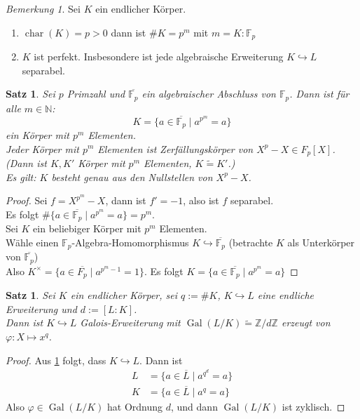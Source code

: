 \documentclass[10pt,a4paper]{article}
\newcommand{\N}{\ensuremath{\mathbb{N}}}
\newcommand{\Z}{\ensuremath{\mathbb{Z}}}
\newcommand{\F}{\ensuremath{\mathbb{F}}}
\newcommand{\ol}[1]{\overline{#1}}
\newcommand{\isomorph}{\ensuremath{\tilde{=}}}
\newcommand{\cha}{\ensuremath{\operatorname{char}}}
\newcommand{\Gal}{\ensuremath{\operatorname{Gal}}}
\newcounter{thm}[section]
\theoremstyle{definition}
\theoremstyle{plain}
\newtheorem{satz}[thm]{Satz}
\theoremstyle{remark}
\newtheorem{bem}[thm]{Bemerkung}
\begin{document}
\begin{bem}
	Sei $K$ ein endlicher Körper.
	\begin{enumerate}
		\item $\cha(K)=p>0$ dann ist $\#K=p^m$ mit $m=K:\F_p$
		\item $K$ ist perfekt. Insbesondere ist jede algebraische Erweiterung $K\hookrightarrow L$ separabel.
	\end{enumerate}
\end{bem}

\begin{satz}\label{1102satz}
	Sei $p$ Primzahl und $\ol{\F_p}$ ein algebraischer Abschluss von $\F_p$. Dann ist für alle $m\in\N$:
	\[K=\{a\in\ol{\F_p}\mid a^{p^m}=a\}\]
	ein Körper mit $p^m$ Elementen.\\
	Jeder Körper mit $p^m$ Elementen ist Zerfällungskörper von $X^p-X\in F_p[X]$. (Dann ist $K,K'$ Körper mit $p^m$ Elementen, $K\isomorph K'$.)\\
	Es gilt: $K$ besteht genau aus den Nullstellen von $X^p-X$.
\end{satz}
\begin{proof}
	Sei $f=X^{p^m}-X$, dann ist $f'=-1$, also ist $f$ separabel.\\
	Es folgt $\#\{a\in\ol{\F_p}\mid a^{p^m}=a\}=p^m$.\\
	Sei $K$ ein beliebiger Körper mit $p^m$ Elementen.\\
	Wähle einen $\F_p$-Algebra-Homomorphismus $K\hookrightarrow\ol{\F_p}$ (betrachte $K$ als Unterkörper von $\ol{\F_p}$)\\
	Also $K^\times=\{a\in\ol{F_p}\mid a^{p^m-1}=1\}$. Es folgt $K=\{a\in\ol{\F_p}\mid a^{p^m}=a\}$
\end{proof}

\begin{satz}
	Sei $K$ ein endlicher Körper, sei $q:=\#K$, $K\hookrightarrow L$ eine endliche Erweiterung und $d:=[L:K]$.\\
	Dann ist $K\hookrightarrow L$ Galois-Erweiterung mit $\Gal(L/K)\isomorph\Z/d\Z$ erzeugt von $\varphi:X\mapsto x^q$.
\end{satz}
\begin{proof}
	Aus \ref{1102satz} folgt, dass $K\hookrightarrow L$. Dann ist
	\begin{align*}
	L&=\{a\in\ol L\mid a^{q^d}=a\}\\
	K&=\{a\in\ol L\mid a^q=a\}
	\end{align*}
	Also $\varphi\in\Gal(L/K)$ hat Ordnung $d$, und dann $\Gal(L/K)$ ist zyklisch.
\end{proof}
\end{document}
